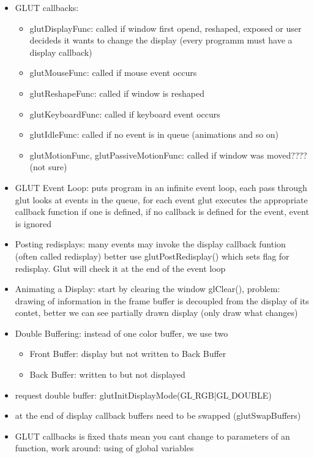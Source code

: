 \documentclass[11pt,a4paper]{article}
\begin{document}
\begin{itemize}
		\item GLUT callbacks:
		\begin{itemize}
			\item glutDisplayFunc: called if window first opend, reshaped, exposed or user decideds it wants to change the display (every programm must have a display callback)
			\item glutMouseFunc: called if mouse event occurs
			\item glutReshapeFunc: called if window is reshaped
			\item glutKeyboardFunc: called if keyboard event occurs
			\item glutIdleFunc: called if no event is in queue (animations and so on)
			\item glutMotionFunc, glutPassiveMotionFunc: called if window was moved????(not sure)
		\end{itemize}
		\item GLUT Event Loop: puts program in an infinite event loop, each pass through glut looks at events in the queue, for each event glut executes the appropriate callback function if one is defined, if no callback is defined for the event, event is ignored
		\item Posting redisplays: many events may invoke the display callback funtion (often called redisplay) better use glutPostRedisplay() which sets flag for redisplay. Glut will check it at the end of the event loop
		\item Animating a Display: start by clearing the window glClear(), problem: drawing of information in the frame buffer is decoupled from the display of its contet, better we can see partially drawn display (only draw what changes)
		\item Double Buffering: instead of one color buffer, we use two
		\begin{itemize}
			\item Front Buffer: display but not written to Back Buffer
			\item Back Buffer: written to but not displayed
		\end{itemize}
		\item request double buffer: glutInitDisplayMode(GL$\_$RGB|GL$\_$DOUBLE)
		\item at the end of display callback buffers need to be swapped (glutSwapBuffers)
		\item GLUT callbacks is fixed thats mean you cant change to parameters of an function, work around: using of global variables 
	\end{itemize}
\end{document}
